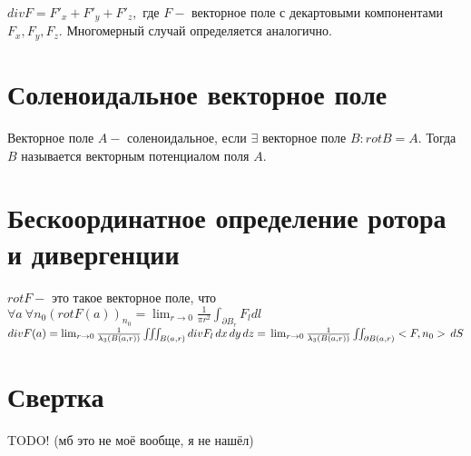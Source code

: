 \documentclass[paper=a4, fontsize=17pt]{article}
\begin{document}
	$div F  = F'_x + F'_y + F'_z, $ где $F - $ векторное поле с декартовыми компонентами $F_x, F_y, F_z$. Многомерный случай определяется аналогично.

	\section{Соленоидальное векторное поле}
	Векторное поле $A-$ соленоидальное, если $\exists$ векторное поле $B: rotB = A$. Тогда $B$ называется векторным потенциалом поля $A$.

	\section{Бескоординатное определение ротора и дивергенции}
	$rot F -$ это такое векторное поле, что $\forall a \ \forall n_0 (rot F(a))_{n_0} = \lim_{r\to 0} \frac{1}{\pi r^2} \int_{\partial B_r} F_ldl$
\\

	$div F(a) = \lim_{r\to 0} \frac{1}{\lambda_3(B(a,r))} \iiint_{B(a,r)} div F_l \,dx\,dy\,dz = \\ \lim_{r\to 0} \frac{1}{\lambda_3(B(a,r))} \iint_{\partial B(a,r)} <F, n_0>\,dS$

	\section{Свертка}
	TODO! (мб это не моё вообще, я не нашёл)
\end{document}
